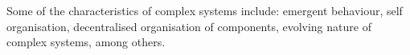\documentclass[10pt,a4paper]{article}
\theoremstyle{plain}
\theoremstyle{definition}
\begin{document}
Some of the characteristics of complex systems include: emergent behaviour, self organisation, decentralised organisation of components, evolving nature of complex systems, among others.

%	
%	
%	
%	
%	
%	
%	
\end{document}
